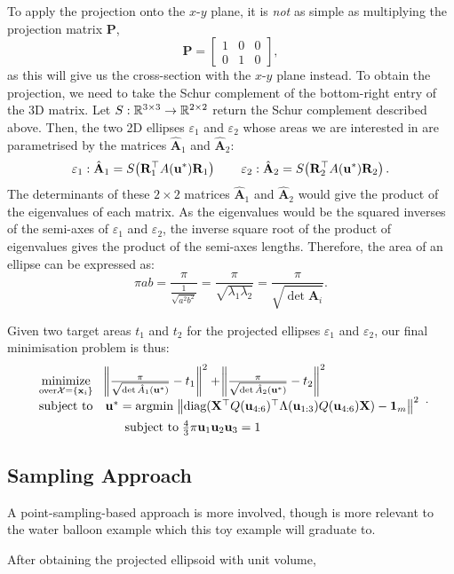 \documentclass{article}
\begin{document}
To apply the projection onto the $x$-$y$ plane, it is \textit{not} as simple as multiplying the projection matrix $\mathbf P$,
\begin{equation}
    \mathbf P = \begin{bmatrix}
        1 & 0 & 0\\
        0 & 1 & 0
    \end{bmatrix},
\end{equation}
as this will give us the cross-section with the $x$-$y$ plane instead. To obtain the projection, we need to take the Schur complement of the bottom-right entry of the 3D matrix. Let $S: \R^{3\times 3} \to \R^{2\times 2}$ return the Schur complement described above. Then, the two 2D ellipses $\varepsilon_1$ and $\varepsilon_2$ whose areas we are interested in are parametrised by the matrices $\hat{\mathbf A}_1$ and $\hat{\mathbf A}_2$:
\begin{align}
    \varepsilon_1:\hat{\mathbf A}_1= S\lr(){ \mathbf{R}_1^\top A(\mathbf u^*) \mathbf{R}_1} \qquad \varepsilon_2: \hat{\mathbf A}_2 = S\lr() {\mathbf{R}_2^\top A(\mathbf u^*) \mathbf{R}_2}.
\end{align}
The determinants of these $2\times 2$ matrices  $\hat{\mathbf A}_1$ and $\hat{\mathbf A}_2$ would give the product of the eigenvalues of each matrix. As the eigenvalues would be the squared inverses of the semi-axes of $\varepsilon_1$ and $\varepsilon_2$, the inverse square root of the product of eigenvalues gives the product of the semi-axes lengths. Therefore, the area of an ellipse can be expressed as:
\begin{equation}
    \pi ab = \frac{\pi }{\frac{1}{\sqrt{a^2b^2}}}= \frac{\pi }{\sqrt{\lambda _1 \lambda _2}} = \frac{\pi}{\sqrt{\det{\hat{\mathbf A}_i}}}.
\end{equation}

Given two target areas $t_1$ and $t_2$ for the projected ellipses $\varepsilon_1$ and $\varepsilon_2$, our final minimisation problem is thus:
$$
\begin{array}{ll}
    \underset{\text{over} \mathcal X = \{ \mathbf x_i \}}{\text{minimize}} &  \lr\Vert\Vert { \frac{\pi}{\sqrt{\det \hat{A}_1(\mathbf u^*)}} - t_1} ^2 + \lr\Vert\Vert{ \frac{\pi}{\sqrt{\det \hat{A}_2(\mathbf u^*)}} - t_2} ^2  \\[0.5em]
  \text{subject to} & \mathbf u^* = \text{argmin} \; \lr\Vert\Vert {\text{diag}(\mathbf X^\top Q(\mathbf u_{4:6}) ^\top \Lambda(\mathbf u_{1:3}) Q(\mathbf u_{4:6}) \mathbf X) - \mathbf 1_m} ^2 \\[0.5em]
  & \hphantom{y =} \text{subject to} \;  \frac{4}{3} \pi \mathbf u_1 \mathbf u_2 \mathbf u_3 = 1
\end{array}.
$$

\subsection{Sampling Approach}
A point-sampling-based approach is more involved, though is more relevant to the water balloon example which this toy example will graduate to.

After obtaining the projected ellipsoid with unit volume, 
\end{document}
